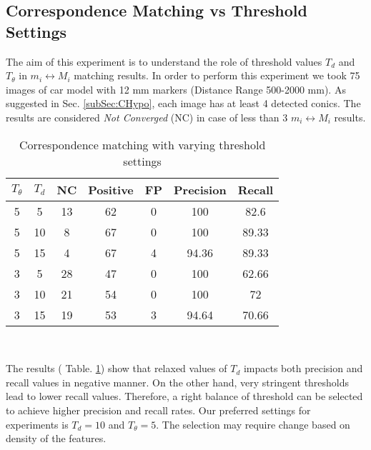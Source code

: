 \documentclass{bmvc2k}
\begin{document}
\subsection{Correspondence Matching vs Threshold Settings}
The aim of this experiment is to understand the role of threshold values $ T_{d}$ and $ T_\theta $ in $ m_i \leftrightarrow M_i $ matching results. 
In order to perform this experiment we took 75 images of car model with 12 mm markers (Distance Range 500-2000 mm). 
As suggested in Sec. \ref{subSec:CHypo}, each image has at least 4 detected conics. 
The results are considered \textit{Not Converged} (NC) in case of less than 3 $ m_i \leftrightarrow M_i $ results.

\begin{table}[h]
\centering
\caption{Correspondence matching with varying threshold settings } \label{table:ThresholdEffect}
\begin{tabular}{ | c | c | c | c | c | c| c |}
\hline
$ T_\theta $ & $ T_{d} $ & NC & Positive & FP & Precision & Recall \\ \hline
5 & 5  & 13 & 62 & 0 & 100 & 82.6 \\
5 & 10 & 8 & 67 & 0 & 100 & 89.33\\
5 & 15 & 4 & 67  & 4 & 94.36 & 89.33\\ \hline
3 & 5  & 28 & 47  & 0 & 100 & 62.66 \\
3 & 10 & 21 & 54  & 0 & 100 & 72 \\
3 & 15 & 19 & 53  & 3 & 94.64 & 70.66 \\ \hline
\end{tabular} \\
\label{tab:Exp2}
\end{table}

The results ( Table. \ref{tab:Exp2}) show that relaxed values of $ T_{d} $ impacts both precision and recall values in negative manner. 
On the other hand, very stringent thresholds lead to lower recall values. Therefore, a right balance of threshold can be selected to achieve higher precision and recall rates. Our preferred settings for experiments is $ T_{d} = 10 $ and $ T_\theta = 5 $. The selection may require change based on density of the features. 
\end{document}
